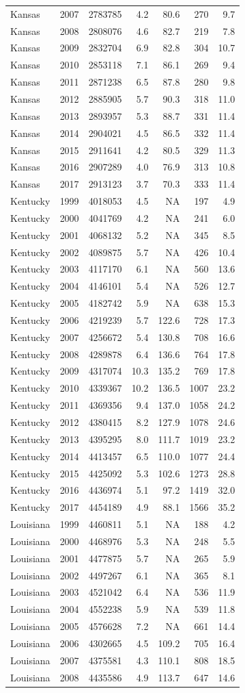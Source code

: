 \documentclass[
]{article}
\begin{document}
\begin{longtable}[]{@{}lrrrrrr@{}}
Kansas & 2007 & 2783785 & 4.2 & 80.6 & 270 & 9.7\tabularnewline
Kansas & 2008 & 2808076 & 4.6 & 82.7 & 219 & 7.8\tabularnewline
Kansas & 2009 & 2832704 & 6.9 & 82.8 & 304 & 10.7\tabularnewline
Kansas & 2010 & 2853118 & 7.1 & 86.1 & 269 & 9.4\tabularnewline
Kansas & 2011 & 2871238 & 6.5 & 87.8 & 280 & 9.8\tabularnewline
Kansas & 2012 & 2885905 & 5.7 & 90.3 & 318 & 11.0\tabularnewline
Kansas & 2013 & 2893957 & 5.3 & 88.7 & 331 & 11.4\tabularnewline
Kansas & 2014 & 2904021 & 4.5 & 86.5 & 332 & 11.4\tabularnewline
Kansas & 2015 & 2911641 & 4.2 & 80.5 & 329 & 11.3\tabularnewline
Kansas & 2016 & 2907289 & 4.0 & 76.9 & 313 & 10.8\tabularnewline
Kansas & 2017 & 2913123 & 3.7 & 70.3 & 333 & 11.4\tabularnewline
Kentucky & 1999 & 4018053 & 4.5 & NA & 197 & 4.9\tabularnewline
Kentucky & 2000 & 4041769 & 4.2 & NA & 241 & 6.0\tabularnewline
Kentucky & 2001 & 4068132 & 5.2 & NA & 345 & 8.5\tabularnewline
Kentucky & 2002 & 4089875 & 5.7 & NA & 426 & 10.4\tabularnewline
Kentucky & 2003 & 4117170 & 6.1 & NA & 560 & 13.6\tabularnewline
Kentucky & 2004 & 4146101 & 5.4 & NA & 526 & 12.7\tabularnewline
Kentucky & 2005 & 4182742 & 5.9 & NA & 638 & 15.3\tabularnewline
Kentucky & 2006 & 4219239 & 5.7 & 122.6 & 728 & 17.3\tabularnewline
Kentucky & 2007 & 4256672 & 5.4 & 130.8 & 708 & 16.6\tabularnewline
Kentucky & 2008 & 4289878 & 6.4 & 136.6 & 764 & 17.8\tabularnewline
Kentucky & 2009 & 4317074 & 10.3 & 135.2 & 769 & 17.8\tabularnewline
Kentucky & 2010 & 4339367 & 10.2 & 136.5 & 1007 & 23.2\tabularnewline
Kentucky & 2011 & 4369356 & 9.4 & 137.0 & 1058 & 24.2\tabularnewline
Kentucky & 2012 & 4380415 & 8.2 & 127.9 & 1078 & 24.6\tabularnewline
Kentucky & 2013 & 4395295 & 8.0 & 111.7 & 1019 & 23.2\tabularnewline
Kentucky & 2014 & 4413457 & 6.5 & 110.0 & 1077 & 24.4\tabularnewline
Kentucky & 2015 & 4425092 & 5.3 & 102.6 & 1273 & 28.8\tabularnewline
Kentucky & 2016 & 4436974 & 5.1 & 97.2 & 1419 & 32.0\tabularnewline
Kentucky & 2017 & 4454189 & 4.9 & 88.1 & 1566 & 35.2\tabularnewline
Louisiana & 1999 & 4460811 & 5.1 & NA & 188 & 4.2\tabularnewline
Louisiana & 2000 & 4468976 & 5.3 & NA & 248 & 5.5\tabularnewline
Louisiana & 2001 & 4477875 & 5.7 & NA & 265 & 5.9\tabularnewline
Louisiana & 2002 & 4497267 & 6.1 & NA & 365 & 8.1\tabularnewline
Louisiana & 2003 & 4521042 & 6.4 & NA & 536 & 11.9\tabularnewline
Louisiana & 2004 & 4552238 & 5.9 & NA & 539 & 11.8\tabularnewline
Louisiana & 2005 & 4576628 & 7.2 & NA & 661 & 14.4\tabularnewline
Louisiana & 2006 & 4302665 & 4.5 & 109.2 & 705 & 16.4\tabularnewline
Louisiana & 2007 & 4375581 & 4.3 & 110.1 & 808 & 18.5\tabularnewline
Louisiana & 2008 & 4435586 & 4.9 & 113.7 & 647 & 14.6\tabularnewline

\end{longtable}
\end{document}
